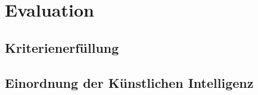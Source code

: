 
\chapter{Evaluation}\label{evaluation}

\section{Kriterienerfüllung}
\section{Einordnung der Künstlichen Intelligenz}



